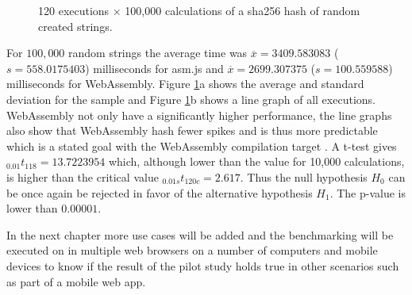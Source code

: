 \begin{figure}[!h]%
\centering
{}%
{}%
\caption{120 executions $\times$ 100,000 calculations of a sha256 hash of random created strings.}%
\label{sha256-hash-100000-1}%
\end{figure}

For $100,000$ random strings the average time was $\overline{x}=3409.583083$ ($s=558.0175403$) milliseconds for asm.js and $\overline{x}=2699.307375$ ($s=100.559588$) milliseconds for WebAssembly. Figure \ref{sha256-hash-100000-1}a shows the average and standard deviation for the sample and Figure \ref{sha256-hash-100000-1}b shows a line graph of all executions. WebAssembly not only have a significantly higher performance, the line graphs also show that WebAssembly hash fewer spikes and is thus more predictable which is a stated goal with the WebAssembly compilation target \parencite{HaasRossbergSchuffTitzerHolmanGohmanWagnerZakaiBastien2017}. A t-test gives $_{0.01}t_{118}=13.7223954$ which, although lower than the value for 10,000 calculations, is higher than the critical value $_{0.01s}t_{120c}=2.617$. Thus the null hypothesis $H_{0}$ can be once again be rejected in favor of the alternative hypothesis $H_{1}$. The p-value is lower than $0.00001$.

In the next chapter more use cases will be added and the benchmarking will be executed on in multiple web browsers on a number of computers and mobile devices to know if the result of the pilot study holds true in other scenarios such as part of a mobile web app.

\clearpage



